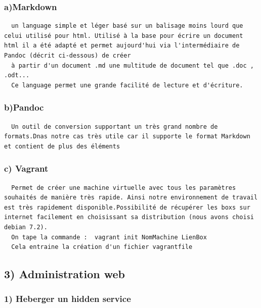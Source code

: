 \documentclass[]{article}
\begin{document}
\subsubsection{a)Markdown}\label{amarkdown}

\begin{verbatim}
  un language simple et léger basé sur un balisage moins lourd que celui utilisé pour html. Utilisé à la base pour écrire un document html il a été adapté et permet aujourd'hui via l'intermédiaire de Pandoc (décrit ci-dessous) de créer
  à partir d'un document .md une multitude de document tel que .doc , .odt...
  Ce language permet une grande facilité de lecture et d'écriture.
\end{verbatim}

\subsubsection{b)Pandoc}\label{bpandoc}

\begin{verbatim}
  Un outil de conversion supportant un très grand nombre de formats.Dnas notre cas très utile car il supporte le format Markdown et contient de plus des éléments
\end{verbatim}

\subsubsection{c) Vagrant}\label{c-vagrant}

\begin{verbatim}
  Permet de créer une machine virtuelle avec tous les paramètres souhaités de manière très rapide. Ainsi notre environnement de travail est très rapidement disponible.Possibilité de récupérer les boxs sur internet facilement en choisissant sa distribution (nous avons choisi debian 7.2).
  On tape la commande :  vagrant init NomMachine LienBox
  Cela entraine la création d'un fichier vagrantfile
\end{verbatim}

\subsection{3) Administration web}\label{administration-web}

\subsubsection{1) Heberger un hidden
service}\label{heberger-un-hidden-service}
\end{document}
